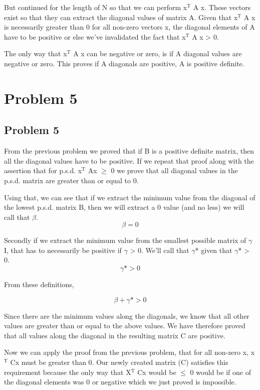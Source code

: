 \documentclass[11pt]{article}
\begin{document}
But continued for the length of N so that we can perform x$^{\text{T}}$ A x. These vectors exist so that they can extract the diagonal values of matrix A. Given that x$^{\text{T}}$ A x is necessarily greater than 0 for all non-zero vectors x, the diagonal elements of A have to be positive or else we've invalidated the fact that x$^{\text{T}}$ A x > 0.


The only way that x$^{\text{T}}$ A x can be negative or zero, is if A diagonal values are negative or zero. This proves if A diagonals are positive, A is positive definite.
\newpage

\section{Problem 5}
\label{sec-5}

\subsection{Problem 5}
\label{sec-5-1}

From the previous problem we proved that if B is a positive definite matrix, then all the diagonal values have to be positive. If we repeat that proof along with the assertion that for p.s.d. x$^{\text{T}}$ Ax $\ge$ 0 we prove that all diagonal values in the p.s.d. matrix are greater than or equal to 0.

Using that, we can see that if we extract the minimum value from the diagonal of the lowest p.s.d. matrix B, then we will extract a 0 value (and no less) we will call that $\beta$.
$$ \beta = 0 $$

Secondly if we extract the minimum value from the smallest possible matrix of $\gamma$ I, that has to necessarily be positive if $\gamma$ > 0. We'll call that $\gamma$* given that $\gamma$* > 0.
$$ \gamma* > 0 $$

From these definitions,

$$ \beta + \gamma* > 0 $$

Since there are the minimum values along the diagonals, we know that all other values are greater than or equal to the above values. We have therefore proved that all values along the diagonal in the resulting matrix C are positive.


Now we can apply the proof from the previous problem, that for all non-zero x, x$^{\text{T}}$ Cx must be greater than 0. Our newly created matrix (C) satisfies this requirement because the only way that X$^{\text{T}}$ Cx would be $\le$ 0 would be if one of the diagonal elements was 0 or negative which we just proved is impossible.
\newpage
\end{document}
